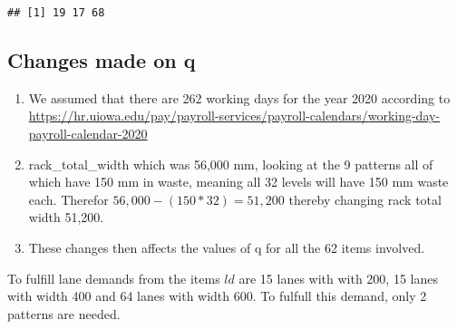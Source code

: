 \documentclass[
]{article}
\newenvironment{Shaded}{\begin{snugshade}}{\end{snugshade}}
\newcommand{\CommentTok}[1]{\textcolor[rgb]{0.56,0.35,0.01}{\textit{#1}}}
\newcommand{\DecValTok}[1]{\textcolor[rgb]{0.00,0.00,0.81}{#1}}
\newcommand{\KeywordTok}[1]{\textcolor[rgb]{0.13,0.29,0.53}{\textbf{#1}}}
\newcommand{\NormalTok}[1]{#1}
\newcommand{\OperatorTok}[1]{\textcolor[rgb]{0.81,0.36,0.00}{\textbf{#1}}}
\newcommand{\StringTok}[1]{\textcolor[rgb]{0.31,0.60,0.02}{#1}}
\begin{document}
\begin{Shaded}
\end{Shaded}

\begin{verbatim}
## [1] 19 17 68
\end{verbatim}

\hypertarget{changes-made-on-q}{%
\subsection{Changes made on q}\label{changes-made-on-q}}

\begin{enumerate}
\def\labelenumi{\arabic{enumi}.}
\item
  We assumed that there are 262 working days for the year 2020 according
  to
  \url{https://hr.uiowa.edu/pay/payroll-services/payroll-calendars/working-day-payroll-calendar-2020}
\item
  rack\_total\_width which was 56,000 mm, looking at the 9 patterns all
  of which have 150 mm in waste, meaning all 32 levels will have 150 mm
  waste each. Therefor \(56,000 - (150 *32) = 51,200\) thereby changing
  rack total width 51,200.
\item
  These changes then affects the values of q for all the 62 items
  involved.
\end{enumerate}

To fulfill lane demands from the items \(ld\) are 15 lanes with with
200, 15 lanes with width 400 and 64 lanes with width 600. To fulfull
this demand, only 2 patterns are needed.
\end{document}

